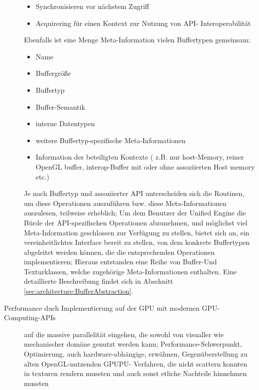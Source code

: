 \begin{description}
\begin{itemize}
		\item Synchronisieren vor nächstem Zugriff
		\item Acquirering für einen Kontext zur Nutzung von API- Interoperabilität	
	\end{itemize}
	Ebenfalls ist eine Menge Meta-Information vielen Buffertypen gemeinsam:
	\begin{itemize}
		\item Name
		\item Buffergröße
		\item Buffertyp
		\item Buffer-Semantik
		\item interne Datentypen
		\item weitere Buffertyp-spezifische Meta-Informationen
		\item Information der beteiligten Kontexte ( z.B. nur host-Memory, reiner OpenGL buffer, 
				interop-Buffer mit oder ohne assoziierten Host memory etc.)
	\end{itemize}
	
	Je nach Buffertyp und assoziierter API unterscheiden sich die Routinen, um diese Operationen auszuführen bzw. diese 	
	Meta-Informationen auszulesen, 
	teilweise erheblich;
	Um dem Benutzer der Unified Engine die Bürde der API-spezifischen Operationen abzunehmen, und möglichst viel
	Meta-Information geschlossen zur Verfügung zu stellen, bietet sich an,
	ein vereinheitlichtes Interface bereit zu stellen, von dem konkrete Buffertypen abgeleitet werden können,
	die die entsprechenden Operationen implementieren;
	Hieraus entstanden eine Reihe von Buffer-Und Texturklassen, welche zugehörige Meta-Informationen \linebreak enthalten.
	Eine detaillierte Beschreibung findet sich in Abschnitt \ref{sec:architecture:BufferAbstraction}.
	
	\item[Performance duch Implementierung auf der GPU mit modernen GPU-Computing-APIs]
	auf die massive parallelität eingehen, die sowohl von visualler wie mechanischer domäne genutzt werden kann;
	Performance-Schwerpunkt, Optimierung, auch hardware-abhängige, erwähnen, Gegenüberstellung zu alten OpenGL-nutzenden 	
	GPUPU- Verfahren, die nicht scattern konnten in texturen rendern mussten und auch sonst etliche Nachteile hinnehmen 	
	mussten
	
	
	

\end{description}
